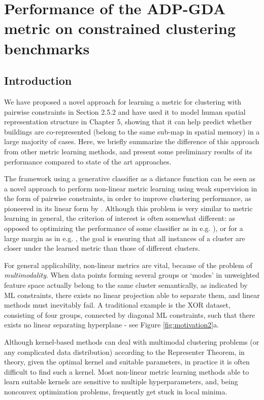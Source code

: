 \chapter[Evaluation of the ADP-GDA metric]{Performance of the ADP-GDA metric on constrained clustering benchmarks}
\label{apx:adsmetric}

\section*{Introduction}

We have proposed a novel approach for learning a metric for clustering with pairwise constraints in Section 2.5.2 and have used it to model human spatial representation structure in Chapter 5, showing that it can help predict whether buildings are co-represented (belong to the same sub-map in spatial memory) in a large majority of cases. Here, we briefly summarize the difference of this approach from other metric learning methods, and present some preliminary results of its performance compared to state of the art approaches.

The framework using a generative classifier as a distance function can be seen as a novel approach to perform non-linear metric learning using weak supervision in the form of pairwise constraints, in order to improve clustering performance, as pioneered in its linear form by \citep{xing2002distance}. Although this problem is very similar to metric learning in general, the criterion of interest is often somewhat different: as opposed to optimizing the performance of some classifier as in e.g. \citep{bellet2012similarity}), or for a large margin as in e.g. \citep{weinberger2005distance}, the goal is ensuring that all instances of a cluster are closer under the learned metric than those of different clusters. 

For general applicability, non-linear metrics are vital, because of the problem of \textit{multimodality}. When data points forming several groups or `modes' in unweighted feature space actually belong to the same cluster semantically, as indicated by ML constraints, there exists no linear projection able to separate them, and linear methods must inevitably fail. A traditional example is the XOR dataset, consisting of four groups, connected by diagonal ML constraints, such that there exists no linear separating hyperplane - see Figure \ref{fig:motivation2}a. 

Although kernel-based methods can deal with multimodal clustering problems (or any complicated data distribution) according to the Representer Theorem, in theory, given the optimal kernel and suitable parameters, in practice it is often difficult to find such a kernel. Most non-linear metric learning methods able to learn suitable kernels are sensitive to multiple hyperparameters, and, being nonconvex optimization problems, frequently get stuck in local minima.

